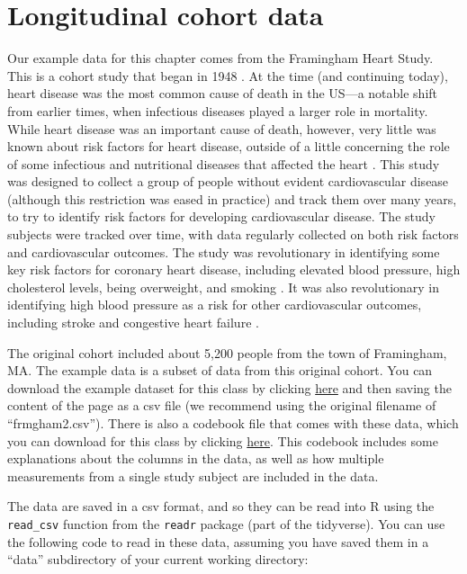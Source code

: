 \documentclass[
]{book}
\begin{document}
\section{Longitudinal cohort data}\label{longitudinal-cohort-data}

Our example data for this chapter comes from the Framingham Heart Study. This is a cohort study that began in 1948 \citep{andersson201970}. At the time (and continuing today), heart disease was the most common cause of death in the US---a notable shift from earlier times, when infectious diseases played a larger role in mortality. While heart disease was an important cause of death, however, very little was known about risk factors for heart disease, outside of a little concerning the role of some infectious and nutritional diseases that affected the heart \citep{dawber1951epidemiological, andersson201970}. This study was designed to collect a group of people without evident cardiovascular disease (although this restriction was eased in practice) and track them over many years, to try to identify risk factors for developing cardiovascular disease. The study subjects were tracked over time, with data regularly collected on both risk factors and cardiovascular outcomes. The study was revolutionary in identifying some key risk factors for coronary heart disease, including elevated blood pressure, high cholesterol levels, being overweight, and smoking \citep{andersson201970}. It was also revolutionary in identifying high blood pressure as a risk for other cardiovascular outcomes, including stroke and congestive heart failure \citep{andersson201970}.

The original cohort included about 5,200 people from the town of Framingham, MA. The
example data is a subset of data from this original cohort. You can download the example dataset for this class by clicking \href{https://github.com/geanders/adv_epi_analysis/raw/master/data/frmgham2.csv}{here} and then saving the content of the page as a csv file (we recommend using the original filename of ``frmgham2.csv''). There is also a codebook file that comes with these data, which you can download for this class by clicking \href{https://github.com/geanders/adv_epi_analysis/raw/master/data/Framingham\%20Longitudinal\%20Data\%20Documentation.pdf}{here}. This codebook includes some explanations about the columns in the data, as well as how multiple measurements from a single study subject are included in the data.

The data are saved in a csv format, and so they can be read into R using the
\texttt{read\_csv} function from the \texttt{readr} package (part of the tidyverse). You can use the following code to read in these data, assuming you have saved them in a ``data'' subdirectory of your current
working directory:
\end{document}
